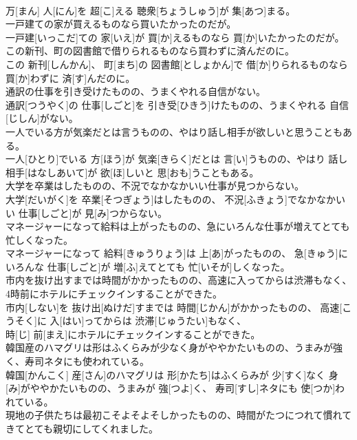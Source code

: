 \documentclass[8pt]{extreport}
\begin{document}
\begin{CJK}{UTF8}{min}
\\	万[まん] 人[にん]を 超[こ]える 聴衆[ちょうしゅう]が 集[あつ]まる。
\\	一戸建ての家が買えるものなら買いたかったのだが。	
\\	一戸建[いっこだ]ての 家[いえ]が 買[か]えるものなら 買[か]いたかったのだが。
\\	この新刊、町の図書館で借りられるものなら買わずに済んだのに。	
\\	この 新刊[しんかん]、 町[まち]の 図書館[としょかん]で 借[か]りられるものなら 買[か]わずに 済[す]んだのに。
\\	通訳の仕事を引き受けたものの、うまくやれる自信がない。	
\\	通訳[つうやく]の 仕事[しごと]を 引き受[ひきう]けたものの、うまくやれる 自信[じしん]がない。
\\	一人でいる方が気楽だとは言うものの、やはり話し相手が欲しいと思うこともある。	
\\	一人[ひとり]でいる 方[ほう]が 気楽[きらく]だとは 言[い]うものの、やはり 話し相手[はなしあいて]が 欲[ほ]しいと 思[おも]うこともある。
\\	大学を卒業はしたものの、不況でなかなかいい仕事が見つからない。	
\\	大学[だいがく]を 卒業[そつぎょう]はしたものの、 不況[ふきょう]でなかなかいい 仕事[しごと]が 見[み]つからない。
\\	マネージャーになって給料は上がったものの、急にいろんな仕事が増えてとても忙しくなった。	
\\	マネージャーになって 給料[きゅうりょう]は 上[あ]がったものの、 急[きゅう]にいろんな 仕事[しごと]が 増[ふ]えてとても 忙[いそが]しくなった。
\\	市内を抜け出すまでは時間がかかったものの、高速に入ってからは渋滞もなく、4時前にホテルにチェックインすることができた。	
\\	市内[しない]を 抜け出[ぬけだ]すまでは 時間[じかん]がかかったものの、 高速[こうそく]に 入[はい]ってからは 渋滞[じゅうたい]もなく、 
\\	時[じ] 前[まえ]にホテルにチェックインすることができた。
\\	韓国産のハマグリは形はふくらみが少なく身がややかたいものの、うまみが強く、寿司ネタにも使われている。	
\\	韓国[かんこく] 産[さん]のハマグリは 形[かたち]はふくらみが 少[すく]なく 身[み]がややかたいものの、うまみが 強[つよ]く、 寿司[すし]ネタにも 使[つか]われている。
\\	現地の子供たちは最初こそよそよそしかったものの、時間がたつにつれて慣れてきてとても親切にしてくれました。	

\end{CJK}
\end{document}

